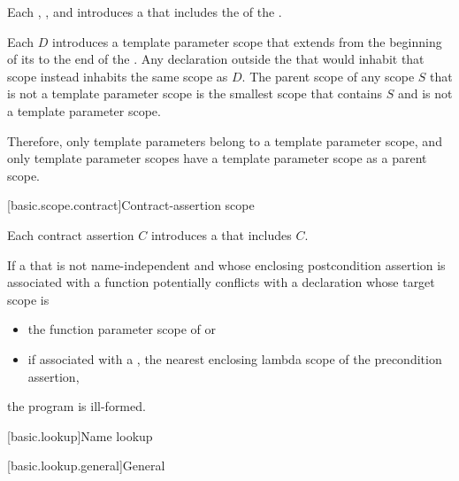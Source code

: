 \pnum
Each
,
, and
introduces
a 
that includes the  of
the .

\pnum
Each  $D$ introduces
a template parameter scope
that extends from the beginning of its 
to the end of the .
Any declaration outside the 
that would inhabit that scope instead inhabits the same scope as $D$.
The parent scope of any scope $S$ that is not a template parameter scope
is the smallest scope that contains $S$ and is not a template parameter scope.
\begin{note}
Therefore, only template parameters belong to a template parameter scope, and
only template parameter scopes have
a template parameter scope as a parent scope.
\end{note}

[basic.scope.contract]{Contract-assertion scope}%

\pnum
Each contract assertion
$C$ introduces a 
that includes $C$.

\pnum
If a 
that is not name-independent
and whose enclosing postcondition assertion
is associated with a function 
potentially conflicts with
a declaration whose target scope is
\begin{itemize}
\item
the function parameter scope of  or
\item
if associated with a ,
the nearest enclosing lambda scope
of the precondition assertion,
\end{itemize}
the program is ill-formed.


[basic.lookup]{Name lookup}%


[basic.lookup.general]{General}%
%

